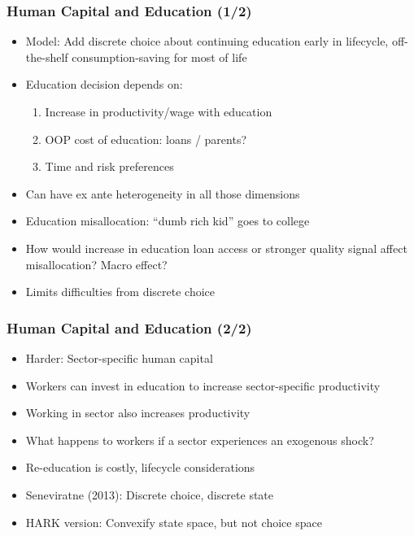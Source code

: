 \documentclass[11pt]{beamer}
\newcommand{\bi}{\begin{itemize}}
\newcommand{\ei}{\end{itemize}}
\begin{document}
\begin{frame}
\frametitle{Human Capital and Education (1/2)}

\bi
\item <1->Model: Add discrete choice about continuing education early in lifecycle, off-the-shelf consumption-saving for most of life

\item <2->Education decision depends on:
\begin{enumerate}
\item <2->Increase in productivity/wage with education

\item <2->OOP cost of education: loans / parents?

\item <2->Time and risk preferences
\end{enumerate}

\item <2->Can have ex ante heterogeneity in all those dimensions

\item <3->Education misallocation: ``dumb rich kid'' goes to college

\item <3->How would increase in education loan access or stronger quality signal affect misallocation? Macro effect?

\item <4->Limits difficulties from discrete choice

\ei
\end{frame}


\begin{frame}
\frametitle{Human Capital and Education (2/2)}

\bi
\item <1->Harder: Sector-specific human capital

\item <1->Workers can invest in education to increase sector-specific productivity

\item <1->Working in sector also increases productivity

\item <2->What happens to workers if a sector experiences an exogenous shock?

\item <2->Re-education is costly, lifecycle considerations

\item <3->Seneviratne (2013): Discrete choice, discrete state

\item <3->HARK version: Convexify state space, but not choice space
\ei
\end{frame}
\end{document}
